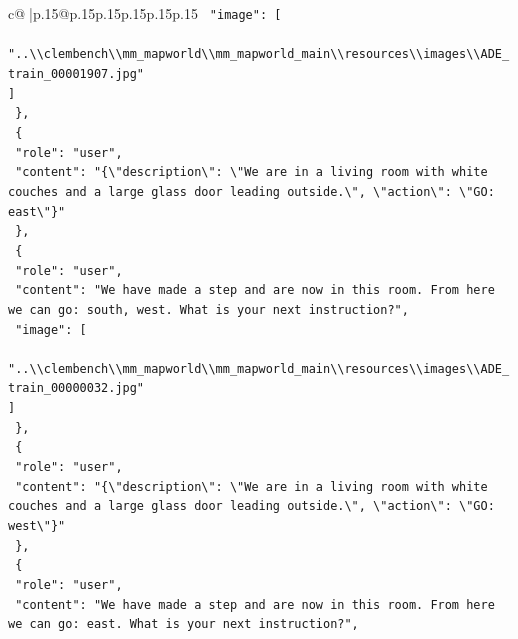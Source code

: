 \documentclass{article}
\begin{document}
{\begin{supertabular}{c@{$\;$}|p{.15\linewidth}@{}p{.15\linewidth}p{.15\linewidth}p{.15\linewidth}p{.15\linewidth}p{.15\linewidth}}
{{{\texttt{    "image": {[}} \\
\texttt{      "..\textbackslash{}\textbackslash{}clembench\textbackslash{}\textbackslash{}mm\_mapworld\textbackslash{}\textbackslash{}mm\_mapworld\_main\textbackslash{}\textbackslash{}resources\textbackslash{}\textbackslash{}images\textbackslash{}\textbackslash{}ADE\_train\_00001907.jpg"} \\
\texttt{    {]}} \\
\texttt{  \},} \\
\texttt{  \{} \\
\texttt{    "role": "user",} \\
\texttt{    "content": "\{\textbackslash{}"description\textbackslash{}": \textbackslash{}"We are in a living room with white couches and a large glass door leading outside.\textbackslash{}", \textbackslash{}"action\textbackslash{}": \textbackslash{}"GO: east\textbackslash{}"\}"} \\
\texttt{  \},} \\
\texttt{  \{} \\
\texttt{    "role": "user",} \\
\texttt{    "content": "We have made a step and are now in this room. From here we can go: south, west. What is your next instruction?",} \\
\texttt{    "image": {[}} \\
\texttt{      "..\textbackslash{}\textbackslash{}clembench\textbackslash{}\textbackslash{}mm\_mapworld\textbackslash{}\textbackslash{}mm\_mapworld\_main\textbackslash{}\textbackslash{}resources\textbackslash{}\textbackslash{}images\textbackslash{}\textbackslash{}ADE\_train\_00000032.jpg"} \\
\texttt{    {]}} \\
\texttt{  \},} \\
\texttt{  \{} \\
\texttt{    "role": "user",} \\
\texttt{    "content": "\{\textbackslash{}"description\textbackslash{}": \textbackslash{}"We are in a living room with white couches and a large glass door leading outside.\textbackslash{}", \textbackslash{}"action\textbackslash{}": \textbackslash{}"GO: west\textbackslash{}"\}"} \\
\texttt{  \},} \\
\texttt{  \{} \\
\texttt{    "role": "user",} \\
\texttt{    "content": "We have made a step and are now in this room. From here we can go: east. What is your next instruction?",} \\
}}}
\end{supertabular}}
\end{document}
